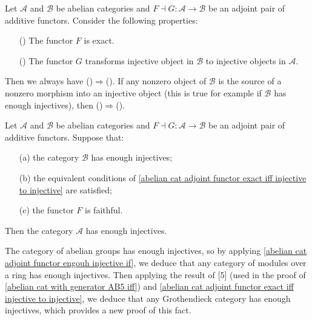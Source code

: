 \begin{proposition}\label{abelian cat adjoint functor exact iff injective to injective}
Let $\mathcal{A}$ and $\mathcal{B}$ be abelian categories and $F\dashv G:\mathcal{A}\to \mathcal{B}$ be an adjoint pair of additive functors. Consider the following properties:
\begin{enumerate}
    \item[(\rmnum{1})] The functor $F$ is exact.
    \item[(\rmnum{2})] The functor $G$ transforms injective object in $\mathcal{B}$ to injective objects in $\mathcal{A}$.
\end{enumerate}
Then we always have ()$\Rightarrow$(). If any nonzero object of $\mathcal{B}$ is the source of a nonzero morphism into an injective object (this is true for example if $\mathcal{B}$ has enough injectives), then ()$\Rightarrow$().
\end{proposition}

\begin{proposition}\label{abelian cat adjoint functor engouh injective if}
Let $\mathcal{A}$ and $\mathcal{B}$ be abelian categories and $F\dashv G:\mathcal{A}\to \mathcal{B}$ be an adjoint pair of additive functors. Suppose that:
\begin{enumerate}
    \item[(a)] the category $\mathcal{B}$ has enough injectives;
    \item[(b)] the equivalent conditions of \cref{abelian cat adjoint functor exact iff injective to injective} are satisfied;
    \item[(c)] the functor $F$ is faithful. 
\end{enumerate}
Then the category $\mathcal{A}$ has enough injectives.
\end{proposition}

\begin{remark}
The category of abelian groups has enough injectives, so by applying \cref{abelian cat adjoint functor engouh injective if}, we deduce that any category of modules over a ring has enough injectives. Then applying the result of [5] (used in the proof of \cref{abelian cat with generator AB5 iff}) and \cref{abelian cat adjoint functor exact iff injective to injective}, we deduce that any Grothendieck category has enough injectives, which provides a new proof of this fact.
\end{remark}

